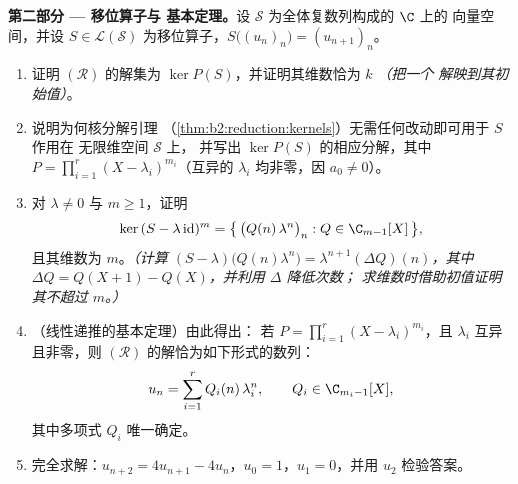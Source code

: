 \begin{problem}
\medskip
\noindent\textbf{第二部分 --- 移位算子与
基本定理。}设 $\mathcal{S}$ 为全体复数列构成的 $\C$ 上的
向量空间，并设 $S \in
\mathcal{L}(\mathcal{S})$ 为移位算子，$S\bigl((u_n)_n\bigr) =
(u_{n+1})_n$。
\begin{enumerate}[resume]
  \item 证明 $(\mathcal R)$ 的解集为 $\ker
        P(S)$，并证明其维数恰为 $k$ \emph{（把一个
        解映到其初始值）}。
  \item 说明为何核分解引理
        （\cref{thm:b2:reduction:kernels}）无需任何改动即可用于 $S$ 作用在
        无限维空间 $\mathcal{S}$ 上，
        并写出 $\ker P(S)$ 的相应分解，其中
        $P = \prod_{i=1}^{r}(X - \lambda_i)^{m_i}$（互异的
        $\lambda_i$ 均非零，因 $a_0 \neq 0$）。
  \item 对 $\lambda \neq 0$ 与 $m \geq 1$，证明
        \[
        \ker\,(S - \lambda\,\mathrm{id})^m
        = \bigl\{\,\bigl(Q(n)\,\lambda^n\bigr)_n : Q \in
        \C_{m-1}[X]\,\bigr\},
        \]
        且其维数为 $m$。\emph{（计算 $(S -
        \lambda)\bigl(Q(n)\lambda^n\bigr) =
        \lambda^{n+1}(\Delta Q)(n)$，其中 $\Delta Q = Q(X + 1) -
        Q(X)$，并利用 $\Delta$ 降低次数；
        求维数时借助初值证明其不超过 $m$。）}
  \item （线性递推的基本定理）由此得出：
        若 $P = \prod_{i=1}^{r}(X - \lambda_i)^{m_i}$，且
        $\lambda_i$ 互异且非零，则
        $(\mathcal R)$ 的解恰为如下形式的数列：
        \[
        u_n = \sum_{i=1}^{r} Q_i(n)\,\lambda_i^n,
        \qquad Q_i \in \C_{m_i - 1}[X],
        \]
        其中多项式 $Q_i$ 唯一确定。
  \item 完全求解：$u_{n+2} = 4u_{n+1} - 4u_n$，$u_0 =
        1$，$u_1 = 0$，并用 $u_2$ 检验答案。
\end{enumerate}


\end{problem}
